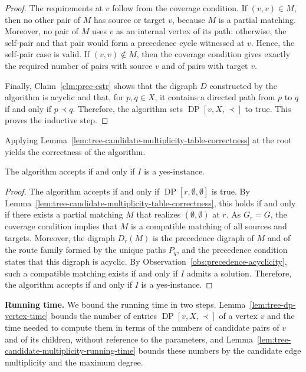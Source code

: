 \documentclass[a4paper,USenglish,thm-restate]{lipics-v2021}
\theoremstyle{problemstyle}
\begin{document}
\begin{proof}
The requirements at $v$ follow from the coverage condition. If $(v,v)\in M$, then no other pair of $M$ has source or target $v$, because $M$ is a partial matching. Moreover, no pair of $M$ uses $v$ as an internal vertex of its path: otherwise, the self-pair and that pair would form a precedence cycle witnessed at $v$. Hence, the self-pair case is valid. If $(v,v)\notin M$, then the coverage condition gives exactly the required number of pairs with source $v$ and of pairs with target $v$.
 
Finally, Claim~\ref{clm:prec-cstr} shows that the digraph $D$ constructed by the algorithm is acyclic and that, for $p,q\in X$, it contains a directed path from $p$ to $q$ if and only if $p\prec q$. Therefore, the algorithm sets $\operatorname{DP}[v,X,\prec]$ to true. This proves the inductive step.
\end{proof}

Applying Lemma~\ref{lem:tree-candidate-multiplicity-table-correctness} at the root yields the correctness of the algorithm.

\begin{lemma}\label{lem:tree-dp-correctness}
The algorithm accepts if and only if $I$ is a yes-instance.
\end{lemma}

\begin{proof}
The algorithm accepts if and only if $\operatorname{DP}[r,\emptyset,\emptyset]$ is true. By Lemma~\ref{lem:tree-candidate-multiplicity-table-correctness}, this holds if and only if there exists a partial matching $M$ that realizes $(\emptyset,\emptyset)$ at $r$. As $G_r=G$, the coverage condition implies that $M$ is a compatible matching of all sources and targets. Moreover, the digraph $D_r(M)$ is the precedence digraph of $M$ and of the route family formed by the unique paths $P_q$, and the precedence condition states that this digraph is acyclic. By Observation~\ref{obs:precedence-acyclicity}, such a compatible matching exists if and only if $I$ admits a solution. Therefore, the algorithm accepts if and only if $I$ is a yes-instance.
\end{proof}

\smallskip
\noindent\textbf{Running time.}
We bound the running time in two steps. Lemma~\ref{lem:tree-dp-vertex-time} bounds the number of entries $\operatorname{DP}[v,X,\prec]$ of a vertex $v$ and the time needed to compute them in terms of the numbers of candidate pairs of $v$ and of its children, without reference to the parameters, and Lemma~\ref{lem:tree-candidate-multiplicity-running-time} bounds these numbers by the candidate edge multiplicity and the maximum degree.
\end{document}
